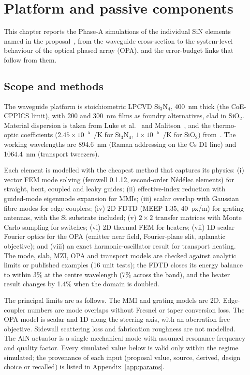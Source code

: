 \section{Platform and passive components}\label{sec:platform}

This chapter reports the Phase-A simulations of the individual SiN elements named in the proposal~\cite{proposal}, from the waveguide cross-section to the system-level behaviour of the optical phased array (OPA), and the error-budget links that follow from them.

\subsection{Scope and methods}\label{sec:platform-methods}

The waveguide platform is stoichiometric LPCVD Si$_3$N$_4$, 400~nm thick (the CoE-CPPICS limit), with 200 and 300~nm films as foundry alternatives, clad in SiO$_2$. Material dispersion is taken from Luke et al.~\cite{LUKE} and Malitson~\cite{MAL}, and the thermo-optic coefficients ($2.45\times10^{-5}$~/K for Si$_3$N$_4$, $1\times10^{-5}$~/K for SiO$_2$) from~\cite{TRC}. The working wavelengths are 894.6~nm (Raman addressing on the Cs D1 line) and 1064.4~nm (transport tweezers).

Each element is modelled with the cheapest method that captures its physics: (i) vector FEM mode solving (femwell 0.1.12, second-order N\'ed\'elec elements) for straight, bent, coupled and leaky guides; (ii) effective-index reduction with guided-mode eigenmode expansion for MMIs; (iii) scalar overlap with Gaussian fibre modes for edge couplers; (iv) 2D FDTD (MEEP 1.35, 40~px/\textmu m) for grating antennas, with the Si substrate included; (v) $2\times2$ transfer matrices with Monte Carlo sampling for switches; (vi) 2D thermal FEM for heaters; (vii) 1D scalar Fourier optics for the OPA (emitter near field, Fourier-plane slit, aplanatic objective); and (viii) an exact harmonic-oscillator result for transport heating. The mode, slab, MZI, OPA and transport models are checked against analytic limits or published examples (16 unit tests); the FDTD closes its energy balance to within 3\% at the centre wavelength (7\% across the band), and the heater result changes by 1.4\% when the domain is doubled.

The principal limits are as follows. The MMI and grating models are 2D. Edge-coupler numbers are mode overlaps without Fresnel or taper conversion loss. The OPA model is scalar and 1D along the steering axis, with an aberration-free objective. Sidewall scattering loss and fabrication roughness are not modelled. The AlN actuator is a single mechanical mode with assumed resonance frequency and quality factor. Every simulated value below is valid only within the regime simulated; the provenance of each input (proposal value, source, derived, design choice or recalled) is listed in Appendix~\ref{app:params}.

